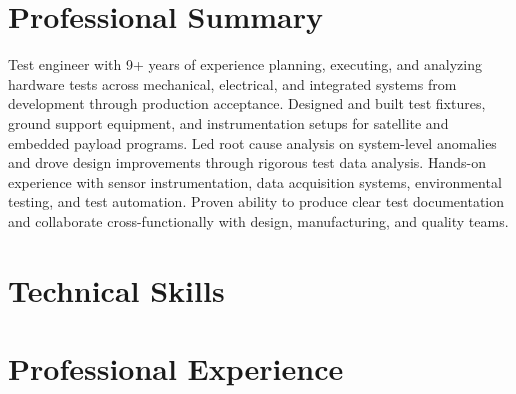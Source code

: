 \documentclass[letterpaper,11pt]{moderncv}
\begin{document}
\makecvtitle
\vspace{-3em}

\section{Professional Summary}
Test engineer with 9+ years of experience planning, executing, and analyzing hardware tests across mechanical, electrical, and integrated systems from development through production acceptance. Designed and built test fixtures, ground support equipment, and instrumentation setups for satellite and embedded payload programs. Led root cause analysis on system-level anomalies and drove design improvements through rigorous test data analysis. Hands-on experience with sensor instrumentation, data acquisition systems, environmental testing, and test automation. Proven ability to produce clear test documentation and collaborate cross-functionally with design, manufacturing, and quality teams.

\section{Technical Skills}
\begin{minipage}[t]{0.48\textwidth}
\end{minipage}%
\hfill
\begin{minipage}[t]{0.48\textwidth}
\end{minipage}

\section{Professional Experience}
\end{document}
